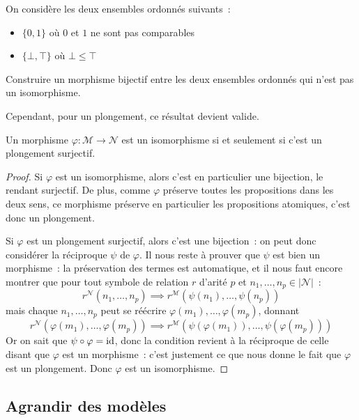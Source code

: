 \begin{exercise}
  On considère les deux ensembles ordonnés suivants~:
  \begin{itemize}
  \item $\{0,1\}$ où $0$ et $1$ ne sont pas comparables
  \item $\{\bot,\top\}$ où $\bot \leq \top$
  \end{itemize}
  Construire un morphisme bijectif entre les deux ensembles ordonnés qui n'est
  pas un isomorphisme.
\end{exercise}

Cependant, pour un plongement, ce résultat devient valide.

\begin{proposition}
  Un morphisme $\varphi : \mathcal M \to \mathcal N$ est un isomorphisme si et
  seulement si c'est un plongement surjectif.
\end{proposition}

\begin{proof}
  Si $\varphi$ est un isomorphisme, alors c'est en particulier une bijection,
  le rendant surjectif. De plus, comme $\varphi$ préserve toutes les
  propositions dans les deux sens, ce morphisme préserve en particulier les
  propositions atomiques, c'est donc un plongement.

  Si $\varphi$ est un plongement surjectif, alors c'est une bijection~: on
  peut donc considérer la réciproque $\psi$ de $\varphi$. Il nous reste à
  prouver que $\psi$ est bien un morphisme~: la préservation des termes est
  automatique, et il nous faut encore montrer que pour tout symbole de relation
  $r$ d'arité $p$ et $n_1,\ldots,n_p\in|\mathcal N|$~:
  \[r^\mathcal N(n_1,\ldots,n_p) \implies r^\mathcal M
  (\psi(n_1),\ldots,\psi(n_p))\]
  mais chaque $n_1,\ldots,n_p$ peut se réécrire
  $\varphi(m_1),\ldots,\varphi(m_p)$, donnant
  \[r^\mathcal N(\varphi(m_1),\ldots,\varphi(m_p)) \implies r^\mathcal M
  (\psi(\varphi(m_1)),\ldots,\psi(\varphi(m_p)))\]
  Or on sait que $\psi\circ \varphi = \operatorname{id}$, donc la condition revient à la
  réciproque de celle disant que $\varphi$ est un morphisme~: c'est justement
  ce que nous donne le fait que $\varphi$ est un plongement. Donc $\varphi$ est
  un isomorphisme.
\end{proof}

\subsection{Agrandir des modèles}

